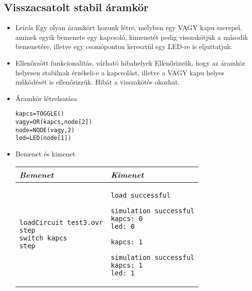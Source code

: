 \subsection{Visszacsatolt stabil áramkör}
\begin{itemize}
\item Leírás\newline
Egy olyan áramkört hozunk létre, melyben egy VAGY kapu szerepel, aminek egyik bemenete egy kapcsoló, kimenetét pedig visszakötjük a második bemenetére, illetve egy csomóponton keresztül egy LED-re is eljuttatjuk.
\item Ellenőrzött funkcionalitás, várható hibahelyek\newline
Ellenőrizzük, hogy az áramkör helyesen stabilnak érzékeli-e a kapcsolást, illetve a VAGY kapu helyes működését is ellenőrizzük. Hibát a visszakötés okozhat.

\item Áramkör létrehozása

\begin{verbatim}
kapcs=TOGGLE()
vagy=OR(kapcs,node[2])
node=NODE(vagy,2)
led=LED(node[1])
\end{verbatim}

\item Bemenet és kimenet\newline

\begin{tabular}{|p{7cm}|p{7cm}|} 
\hline 
\textit{Bemenet} & \textit{Kimenet} \\ \hline
\begin{verbatim}
loadCircuit test3.ovr
step
switch kapcs
step
\end{verbatim}
& 
\begin{verbatim}
load successful

simulation successful
kapcs: 0
led: 0

kapcs: 1

simulation successful
kapcs: 1
led: 1
\end{verbatim}
\\ \hline
\end{tabular}

\end{itemize}


